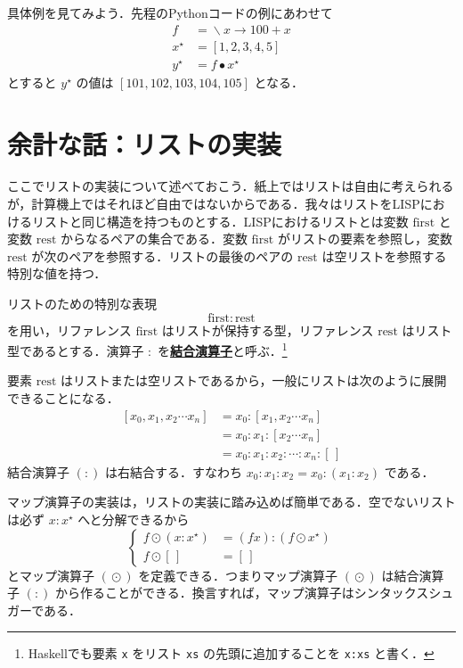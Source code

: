 \documentclass[a4paper,twocolumn]{jsbook}
\newcommand{\programminglanguage}[1]{\textsf{#1}}
\newcommand{\haskell}{\programminglanguage{Haskell}}
\newcommand{\lisp}{\programminglanguage{LISP}}
\newcommand{\python}{\programminglanguage{Python}}
\newcommand{\keyword}[1]{{\underline{\textbf{#1}}}}
\newcommand{\code}[1]{\texttt{#1}}
\newcommand{\mEmptyList}{{[\,]}}
\newcommand{\mSpecialVar}[1]{\mathrm{#1}} %
\newcommand{\mFirstVar}{\mSpecialVar{first}}
\newcommand{\mRestVar}{\mSpecialVar{rest}}
\DeclareMathOperator{\mLambda}{\backslash}
\DeclareMathOperator{\mLambdaArrow}{\rightarrow}
\DeclareMathOperator{\mMap}{\bullet}
\DeclareMathOperator{\mMapList}{\odot}
\newcommand{\mListWith}[1]{\left[#1\right]}
\newcommand{\mList}[1]{{#1}^\mathrm{\star}}
\newcommand{\mLambdaExp}[2]{\mLambda{#1}\mLambdaArrow{#2}}
\begin{document}
具体例を見てみよう．先程の\python コードの例にあわせて
\begin{align}
f&=\mLambdaExp{x}{100+x}\\
\mList{x}&=\mListWith{1,2,3,4,5}\\
\mList{y}&=f\mMap\mList{x}
\end{align}
とすると $\mList{y}$ の値は $\mListWith{101,102,103,104,105}$ となる．

\section{余計な話：リストの実装}

ここでリストの実装について述べておこう．紙上ではリストは自由に考えられるが，計算機上ではそれほど自由ではないからである．我々はリストを\lisp におけるリストと同じ構造を持つものとする．\lisp におけるリストとは変数 $\mFirstVar$ と変数 $\mRestVar$ からなるペアの集合である．変数 $\mFirstVar$ がリストの要素を参照し，変数 $\mRestVar$ が次のペアを参照する．リストの最後のペアの $\mRestVar$ は空リストを参照する特別な値を持つ．

リストのための特別な表現
\begin{equation}
\mFirstVar:\mRestVar
\end{equation}
を用い，リファレンス $\mFirstVar$ はリストが保持する型，リファレンス $\mRestVar$ はリスト型であるとする．演算子 $:$ を\keyword{結合演算子}と呼ぶ．\footnote{\haskell でも要素 \code{x} をリスト \code{xs} の先頭に追加することを \code{x:xs} と書く．}

要素 $\mRestVar$ はリストまたは空リストであるから，一般にリストは次のように展開できることになる．
\begin{align}
\mListWith{x_0,x_1,x_2\dotsb x_n}
  &=x_0:\mListWith{x_1,x_2\dotsb x_n}\\
  &=x_0:x_1:\mListWith{x_2\dotsb x_n}\\
  &=x_0:x_1:x_2:\dotsb:x_n:\mEmptyList
\end{align}
結合演算子 $(:)$ は右結合する．すなわち $x_0:x_1:x_2=x_0:(x_1:x_2)$ である．

マップ演算子の実装は，リストの実装に踏み込めば簡単である．空でないリストは必ず $x:\mList{x}$ へと分解できるから
\begin{equation}
\left\{
\begin{split}
f\mMapList{}(x:\mList{x})
  &=(fx):(f\mMapList\mList{x})\\
f\mMapList\mEmptyList
  &=\mEmptyList
\end{split}
\right.
\end{equation}
とマップ演算子 $(\mMapList)$ を定義できる．つまりマップ演算子 $(\mMapList)$ は結合演算子 $(:)$ から作ることができる．換言すれば，マップ演算子はシンタックスシュガーである．
\end{document}
